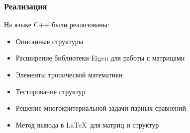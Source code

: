 \documentclass[ucs, notheorems, handout]{beamer}
\begin{document}
\begin{frame}
    \frametitle{Реализация}
    
    На языке C++ были реализованы:
    \begin{itemize}
        \item Описанные структуры
        \item Расширение библиотеки Eigen для работы с матрицами
        \item Элементы тропической математики
        \item Тестирование структур
        \item Решение многокритериальной задачи парных сравнений
        \item Метод вывода в \LaTeX \, для матриц и структур
    \end{itemize}

\end{frame}

\end{document}
